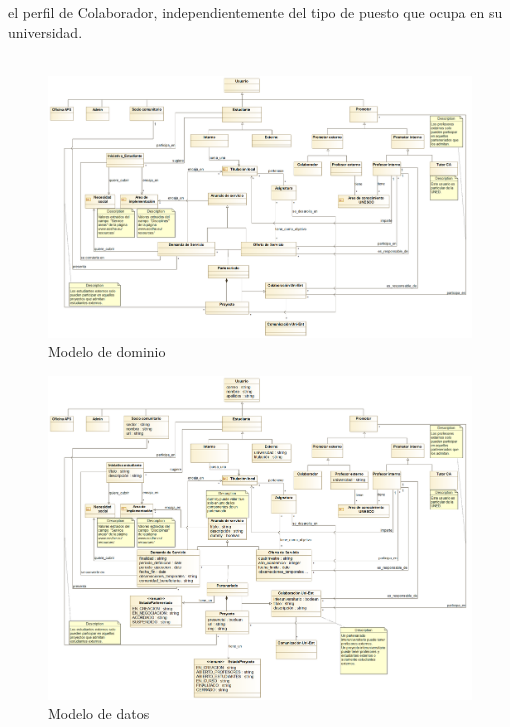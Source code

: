 \documentclass[11pt]{book}
\begin{document}
el perfil de Colaborador, independientemente del tipo de puesto que
ocupa en su universidad.\\\\
\begin{figure}[t]
	\centering
	\includegraphics[scale=0.23]{mdominio}
	\caption{Modelo de dominio}
	\label{fig:dominio}
\end{figure}
\begin{figure}[t]
	\centering
	\includegraphics[scale=0.23]{mdatos}
	\caption{Modelo de datos}
	\label{fig:datos}
\end{figure}
\end{document}
